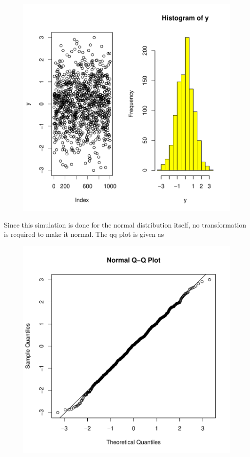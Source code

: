 \documentclass[12pt]{article}
\begin{document}
\begin{figure}[H]
\includegraphics{HW1-005}
\end{figure}

\item Since this simulation is done for the normal distribution itself, no transformation is required to make it normal. The qq plot is given as 

\begin{figure}[H]
\includegraphics{HW1-006}
\end{figure}
\end{document}
